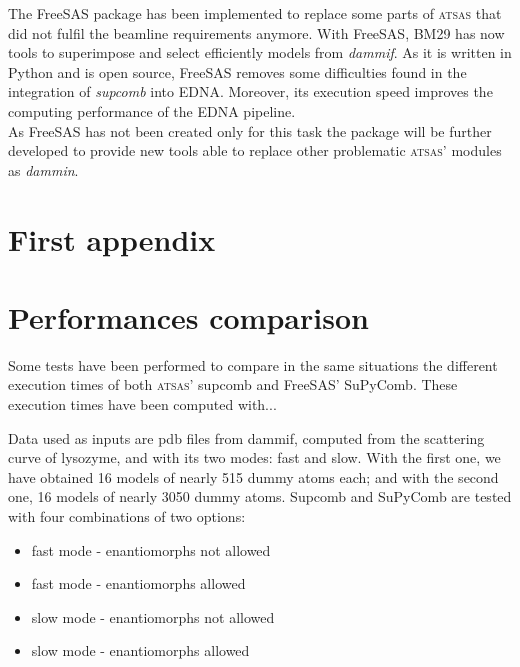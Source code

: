 \documentclass[a4paper, 11pt]{report}
\begin{document}
The FreeSAS package has been implemented to replace some parts of 
\textsc{atsas} that did not fulfil the beamline requirements anymore. 
With FreeSAS, BM29 has now tools to superimpose and select efficiently 
models from \textit{dammif}. 
As it is written in Python and is open source, FreeSAS removes some 
difficulties found in the integration of \textit{supcomb} into EDNA. 
Moreover, its execution speed improves the computing performance of 
the EDNA pipeline.\\

As FreeSAS has not been created only for this task the package will be 
further developed to provide new tools able to replace other 
problematic \textsc{atsas}' modules as \textit{dammin}.


\newpage                 %



\appendix


\chapter{First appendix}

\chapter{Performances comparison}
\label{perfappendix}

Some tests have been performed to compare in the same situations the 
different execution times of both \textsc{atsas}' supcomb and FreeSAS' 
SuPyComb. 
These execution times have been computed with... %

Data used as inputs are pdb files from dammif, computed from the 
scattering curve of lysozyme, and with its two modes: fast and slow. 
With the first one, we have obtained 16 models of nearly 515 dummy 
atoms each; and with the second one, 16 models of nearly 3050 dummy 
atoms. 
Supcomb and SuPyComb are tested with four combinations of two options: 
\begin{itemize}
\item fast mode - enantiomorphs not allowed
\item fast mode - enantiomorphs allowed
\item slow mode - enantiomorphs not allowed
\item slow mode - enantiomorphs allowed
\end{itemize}
\end{document}
